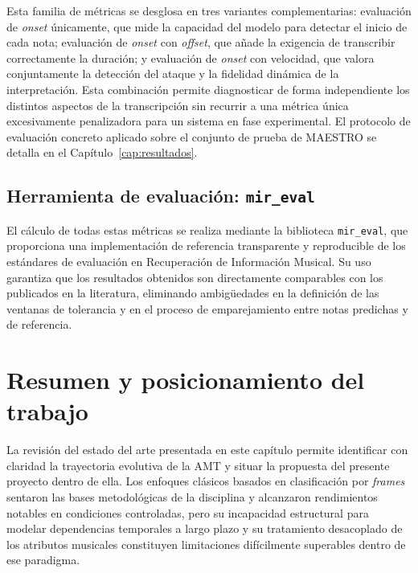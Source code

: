 Esta familia de métricas se desglosa en tres variantes complementarias:
evaluación de \textit{onset} únicamente, que mide la capacidad del
modelo para detectar el inicio de cada nota; evaluación de
\textit{onset} con \textit{offset}, que añade la exigencia de
transcribir correctamente la duración; y evaluación de \textit{onset}
con velocidad, que valora conjuntamente la detección del ataque y la
fidelidad dinámica de la interpretación. Esta combinación permite
diagnosticar de forma independiente los distintos aspectos de la
transcripción sin recurrir a una métrica única excesivamente
penalizadora para un sistema en fase experimental. El protocolo de
evaluación concreto aplicado sobre el conjunto de prueba de MAESTRO
se detalla en el Capítulo~\ref{cap:resultados}.

\subsection{Herramienta de evaluación: \texttt{mir\_eval}}

El cálculo de todas estas métricas se realiza mediante la biblioteca
\texttt{mir\_eval}, que proporciona una implementación de referencia
transparente y reproducible de los estándares de evaluación en
Recuperación de Información Musical. Su uso garantiza que los resultados
obtenidos son directamente comparables con los publicados en la
literatura, eliminando ambigüedades en la definición de las ventanas de
tolerancia y en el proceso de emparejamiento entre notas predichas y de
referencia.


\section{Resumen y posicionamiento del trabajo}
 
La revisión del estado del arte presentada en este capítulo permite identificar con claridad
la trayectoria evolutiva de la AMT y situar la propuesta del presente proyecto dentro
de ella. Los enfoques clásicos basados en clasificación por \textit{frames} sentaron las
bases metodológicas de la disciplina y alcanzaron rendimientos notables en condiciones
controladas, pero su incapacidad estructural para modelar dependencias temporales a
largo plazo y su tratamiento desacoplado de los atributos musicales constituyen limitaciones
difícilmente superables dentro de ese paradigma.
 
